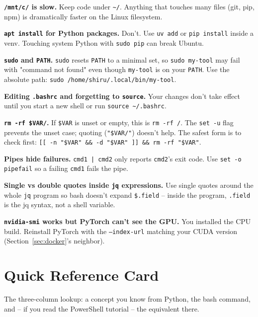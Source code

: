 \documentclass[11pt,a4paper]{article}
\begin{document}
\textbf{\texttt{/mnt/c/} is slow.} Keep code under
\texttt{\textasciitilde{}/}. Anything that touches many files (git,
pip, npm) is dramatically faster on the Linux filesystem.

\textbf{\texttt{apt install} for Python packages.} Don't. Use
\texttt{uv add} or \texttt{pip install} inside a venv. Touching
system Python with \texttt{sudo pip} can break Ubuntu.

\textbf{\texttt{sudo} and \texttt{PATH}.} \texttt{sudo} resets
\texttt{PATH} to a minimal set, so \texttt{sudo my-tool} may fail
with "command not found" even though \texttt{my-tool} is on your
\texttt{PATH}. Use the absolute path:
\texttt{sudo /home/shiru/.local/bin/my-tool}.

\textbf{Editing \texttt{.bashrc} and forgetting to \texttt{source}.}
Your changes don't take effect until you start a new shell or run
\texttt{source \textasciitilde{}/.bashrc}.

\textbf{\texttt{rm -rf \$VAR/}.} If \texttt{\$VAR} is unset or empty,
this is \texttt{rm -rf /}. The \texttt{set -u} flag prevents the
unset case; quoting (\texttt{"\$VAR/"}) doesn't help. The safest
form is to check first: \texttt{[[ -n "\$VAR" \&\& -d "\$VAR" ]]
\&\& rm -rf "\$VAR"}.

\textbf{Pipes hide failures.} \texttt{cmd1 | cmd2} only reports
\texttt{cmd2}'s exit code. Use \texttt{set -o pipefail} so a failing
\texttt{cmd1} fails the pipe.

\textbf{Single vs double quotes inside \texttt{jq} expressions.}
Use single quotes around the whole \texttt{jq} program so bash
doesn't expand \texttt{\$.field} -- inside the program, \texttt{.field}
is the jq syntax, not a shell variable.

\textbf{\texttt{nvidia-smi} works but PyTorch can't see the GPU.}
You installed the CPU build. Reinstall PyTorch with the
\texttt{--index-url} matching your CUDA version
(Section~\ref{sec:docker}'s neighbor).

\section{Quick Reference Card}

The three-column lookup: a concept you know from Python, the bash
command, and -- if you read the PowerShell tutorial -- the
equivalent there.
\end{document}
